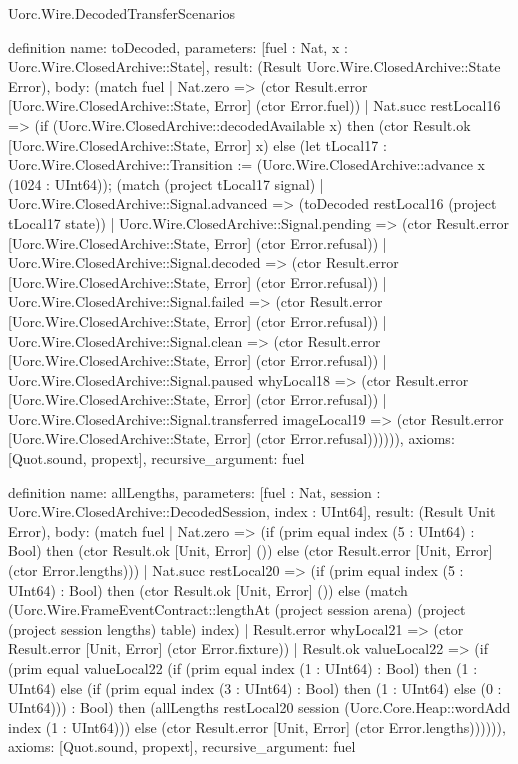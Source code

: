 \begin{lexlean}{Uorc.Wire.DecodedTransferScenarios}
\begin{semanticmodule}
definition{
  name: toDecoded,
  parameters: [fuel : Nat, x : Uorc.Wire.ClosedArchive::State],
  result: (Result Uorc.Wire.ClosedArchive::State Error),
  body: (match fuel
    | Nat.zero => (ctor Result.error [Uorc.Wire.ClosedArchive::State, Error] (ctor Error.fuel))
    | Nat.succ restLocal16 => (if (Uorc.Wire.ClosedArchive::decodedAvailable x) then (ctor Result.ok [Uorc.Wire.ClosedArchive::State, Error] x) else (let tLocal17 : Uorc.Wire.ClosedArchive::Transition := (Uorc.Wire.ClosedArchive::advance x (1024 : UInt64)); (match (project tLocal17 signal)
      | Uorc.Wire.ClosedArchive::Signal.advanced => (toDecoded restLocal16 (project tLocal17 state))
      | Uorc.Wire.ClosedArchive::Signal.pending => (ctor Result.error [Uorc.Wire.ClosedArchive::State, Error] (ctor Error.refusal))
      | Uorc.Wire.ClosedArchive::Signal.decoded => (ctor Result.error [Uorc.Wire.ClosedArchive::State, Error] (ctor Error.refusal))
      | Uorc.Wire.ClosedArchive::Signal.failed => (ctor Result.error [Uorc.Wire.ClosedArchive::State, Error] (ctor Error.refusal))
      | Uorc.Wire.ClosedArchive::Signal.clean => (ctor Result.error [Uorc.Wire.ClosedArchive::State, Error] (ctor Error.refusal))
      | Uorc.Wire.ClosedArchive::Signal.paused whyLocal18 => (ctor Result.error [Uorc.Wire.ClosedArchive::State, Error] (ctor Error.refusal))
      | Uorc.Wire.ClosedArchive::Signal.transferred imageLocal19 => (ctor Result.error [Uorc.Wire.ClosedArchive::State, Error] (ctor Error.refusal)))))),
  axioms: [Quot.sound, propext],
  recursive_argument: fuel
}

definition{
  name: allLengths,
  parameters: [fuel : Nat, session : Uorc.Wire.ClosedArchive::DecodedSession, index : UInt64],
  result: (Result Unit Error),
  body: (match fuel
    | Nat.zero => (if (prim equal index (5 : UInt64) : Bool) then (ctor Result.ok [Unit, Error] ()) else (ctor Result.error [Unit, Error] (ctor Error.lengths)))
    | Nat.succ restLocal20 => (if (prim equal index (5 : UInt64) : Bool) then (ctor Result.ok [Unit, Error] ()) else (match (Uorc.Wire.FrameEventContract::lengthAt (project session arena) (project (project session lengths) table) index)
      | Result.error whyLocal21 => (ctor Result.error [Unit, Error] (ctor Error.fixture))
      | Result.ok valueLocal22 => (if (prim equal valueLocal22 (if (prim equal index (1 : UInt64) : Bool) then (1 : UInt64) else (if (prim equal index (3 : UInt64) : Bool) then (1 : UInt64) else (0 : UInt64))) : Bool) then (allLengths restLocal20 session (Uorc.Core.Heap::wordAdd index (1 : UInt64))) else (ctor Result.error [Unit, Error] (ctor Error.lengths)))))),
  axioms: [Quot.sound, propext],
  recursive_argument: fuel
}


\end{semanticmodule}
\end{lexlean}
